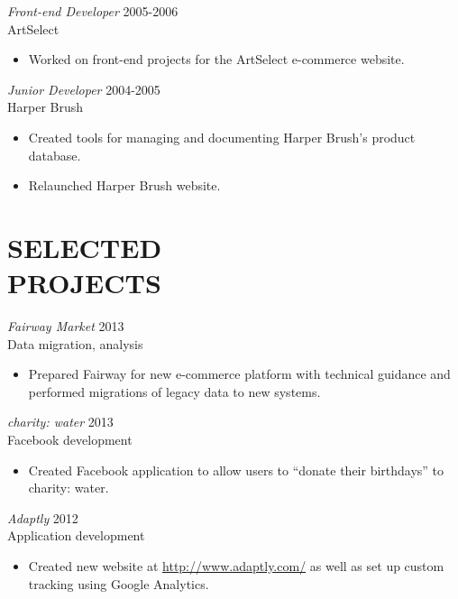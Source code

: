 \documentclass[line,margin]{res}
\begin{document}
\begin{resume}
    {\sl Front-end Developer}
    \hfill 2005-2006 \\
    ArtSelect
    \begin{itemize} \itemsep -2pt
        \item
            Worked on front-end projects for the ArtSelect e-commerce website.
    \end{itemize}

    {\sl Junior Developer}
    \hfill 2004-2005 \\
    Harper Brush
    \begin{itemize} \itemsep -2pt
        \item
            Created tools for managing and documenting Harper Brush's product database.
        \item
            Relaunched Harper Brush website.
    \end{itemize}



\section{SELECTED \\ PROJECTS}
    {\sl Fairway Market}
    \hfill 2013 \\
    Data migration, analysis
    \begin{itemize} \itemsep -2pt
        \item
            Prepared Fairway for new e-commerce platform with technical guidance and
            performed migrations of legacy data to new systems.
    \end{itemize}

    {\sl charity: water}
    \hfill 2013 \\
    Facebook development
    \begin{itemize} \itemsep -2pt
        \item
            Created Facebook application to allow users to ``donate their birthdays'' to charity: water.
    \end{itemize}

    {\sl Adaptly}
    \hfill 2012 \\
    Application development
    \begin{itemize} \itemsep -2pt
        \item
            Created new website at \url{http://www.adaptly.com/} as well as set up custom tracking using
            Google Analytics.
    \end{itemize}


\end{resume}
\end{document}
